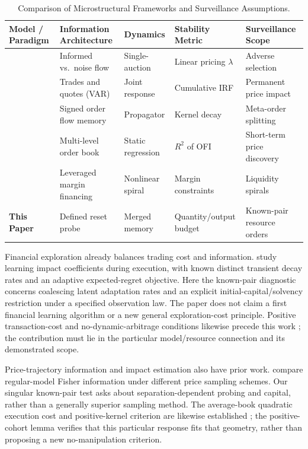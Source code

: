 \documentclass[12pt]{article}
\theoremstyle{definition}
\theoremstyle{remark}
\begin{document}
\begin{table}[htbp]
\centering\footnotesize
\caption{Comparison of Microstructural Frameworks and Surveillance Assumptions.}
\label{tab:lit_comparison}
\begin{tabularx}{\textwidth}{p{3.2cm}Xp{2.2cm}XX}\toprule
Model / Paradigm & Information Architecture & Dynamics & Stability Metric & Surveillance Scope \\\midrule
\citet{kyle1985continuous} & Informed vs.\ noise flow & Single-auction & Linear pricing $\lambda$ & Adverse selection \\
\citet{hasbrouck1991} & Trades and quotes (VAR) & Joint response & Cumulative IRF & Permanent price impact \\
\citet{bouchaud2004fluctuations} & Signed order flow memory & Propagator & Kernel decay & Meta-order splitting \\
\citet{cont2014} & Multi-level order book & Static regression & $R^2$ of OFI & Short-term price discovery \\
\citet{brunnermeier2009} & Leveraged margin financing & Nonlinear spiral & Margin constraints & Liquidity spirals \\
\textbf{This Paper} & Defined reset probe & Merged memory & Quantity/output budget & Known-pair resource orders \\\bottomrule
\end{tabularx}
\end{table}

Financial exploration already balances trading cost and information. \citet{parkvanroy2012} study learning impact coefficients during execution, with known distinct transient decay rates and an adaptive expected-regret objective. Here the known-pair diagnostic concerns coalescing latent adaptation rates and an explicit initial-capital/solvency restriction under a specified observation law. The paper does not claim a first financial learning algorithm or a new general exploration-cost principle. Positive transaction-cost and no-dynamic-arbitrage conditions likewise precede this work \citep{gatheral2010,schneiderlillo2017}; the contribution must lie in the particular model/resource connection and its demonstrated scope.

Price-trajectory information and impact estimation also have prior work. \citet{li2024trajectory} compare regular-model Fisher information under different price sampling schemes. Our singular known-pair test asks about separation-dependent probing and capital, rather than a generally superior sampling method. The average-book quadratic execution cost and positive-kernel criterion are likewise established \citep{alfonsi2016matrix}; the positive-cohort lemma verifies that this particular response fits that geometry, rather than proposing a new no-manipulation criterion.
\end{document}
